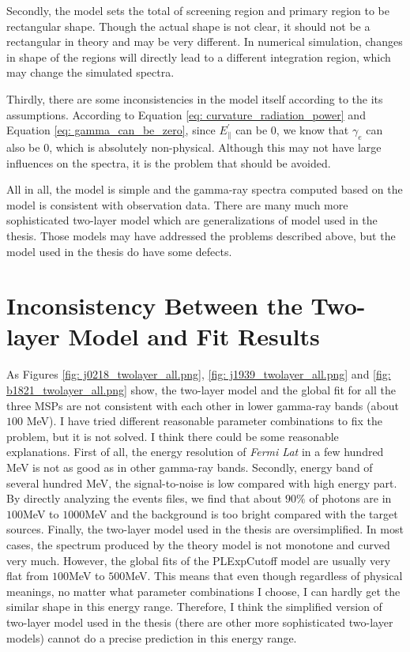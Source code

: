\documentclass[12pt]{report}
\begin{document}
        Secondly, the model sets the total of screening region and primary region to be 
        rectangular shape. Though the actual shape is not clear, it should not be a 
        rectangular in theory and may be very different. In numerical simulation, changes 
        in shape of the regions will directly lead to a different integration region, 
        which may change the simulated spectra.

        Thirdly, there are some inconsistencies in the model itself according to the its 
        assumptions. According to Equation \ref{eq: curvature_radiation_power} and Equation 
        \ref{eq: gamma_can_be_zero}, since $E_{\parallel}^{\prime}$ can be $0$, we know that 
        $\gamma_{e}$ can also be $0$, which is absolutely non-physical. Although this may not 
        have large influences on the spectra, it is the problem that should be avoided.

        All in all, the model is simple and the gamma-ray spectra computed based on the model 
        is consistent with observation data. There are many much more sophisticated 
        two-layer model which are generalizations of model used in the thesis. Those models 
        may have addressed the problems described above, but the model used in the thesis 
        do have some defects. 
    
    \section{Inconsistency Between the Two-layer Model and Fit Results}
      As Figures \ref{fig: j0218_twolayer_all.png}, \ref{fig: j1939_twolayer_all.png} and 
      \ref{fig: b1821_twolayer_all.png} show, the two-layer model and the global fit for all 
      the three MSPs are not consistent with each other in lower gamma-ray bands (about $100$ 
      MeV). I have tried different reasonable parameter combinations to fix the problem, but 
      it is not solved. I think there could be some reasonable explanations. First of all, 
      the energy resolution of \textit{Fermi Lat} in a few hundred MeV is not as good as in 
      other gamma-ray bands. Secondly, energy band of several hundred MeV, the signal-to-noise 
      is low compared with high energy part. By directly analyzing the events files, we find that 
      about $90\%$ of photons are in $100$MeV to $1000$MeV and the background is too bright 
      compared with the target sources. Finally, the two-layer model used in the thesis are 
      oversimplified. In most cases, the spectrum produced by the theory model is not monotone and 
      curved very much. However, the global fits of the PLExpCutoff model are usually very 
      flat from $100$MeV to $500$MeV. This means that even though regardless of physical meanings,
      no matter what parameter combinations I choose, I can hardly get the similar shape in this 
      energy range. Therefore, I think the simplified version of two-layer model used in the 
      thesis (there are other more sophisticated two-layer models) cannot do a precise prediction 
      in this energy range. 
      
\end{document}
